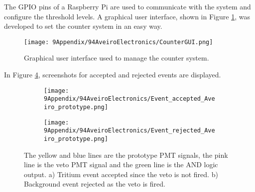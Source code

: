 \begin{enumerate}
The GPIO pins of a Raspberry Pi are used to communicate with the system and configure the threshold levels. A graphical user interface, shown in Figure \ref{fig:GUIcounts}, was developed to set the counter system in an easy way.
\begin{figure}[h]
\centering
\texttt{[image: 9Appendix/94AveiroElectronics/CounterGUI.png]}
\caption{Graphical user interface used to manage the counter system. \label{fig:GUIcounts}}
\end{figure}
In Figure \ref{fig:ScreenshotElectronic}, screenshots for accepted and rejected events are displayed.
\begin{figure}
\centering
    \begin{subfigure}[b]{0.75\textwidth}
    \centering
    \texttt{[image: 9Appendix/94AveiroElectronics/Event\_accepted\_Aveiro\_prototype.png]}  
    \caption{\label{subfig:TrueTritiumEvent}}
    \end{subfigure}
    \hfill
    \begin{subfigure}[b]{0.75\textwidth}
    \centering
    \texttt{[image: 9Appendix/94AveiroElectronics/Event\_rejected\_Aveiro\_prototype.png]}  
    \caption{\label{subfig:FalseTritiumEvent}}
    \end{subfigure}
 \caption{The yellow and blue lines are the prototype PMT signals, the pink line is the veto PMT signal and the green line is the AND logic output. a) Tritium event accepted since the veto is not fired. b) Background event rejected as the veto is fired.}
 \label{fig:ScreenshotElectronic}
\end{figure}

\end{enumerate}